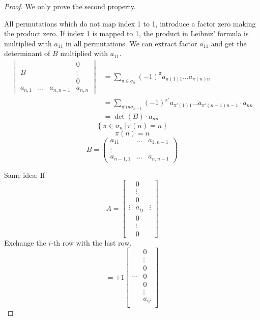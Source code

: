 \documentclass{article}
\numberwithin{lecref}{section}
\newcommand{\setdef}[2]{\left\{\left.#1\,\right|\,#2\right\}}
\begin{document}
\begin{proof}
  We only prove the second property.

  All permutations which do not map index 1 to 1, introduce a factor zero making the product zero.
  If index 1 is mapped to 1, the product in Leibniz' formula is multiplied with $a_{11}$ in all permutations.
  We can extract factor $a_{11}$ and get the determinant of $B$ multiplied with $a_{11}$.
  \begin{align*}
    \begin{vmatrix}
             &         &           & 0  \\
      B      &         &           & \vdots \\
             &         &           & 0  \\
      a_{n,1} & \ldots & a_{n,n-1} & a_{n,n}
    \end{vmatrix}
    &= \sum_{\pi \in \sigma_n} (-1)^{\pi} a_{\pi(1) 1} \dots a_{\pi(n) n} \\
    &= \sum_{\pi' in \sigma_{n-1}} (-1)^{\pi'} a_{\pi'(1) 1} \dots a_{\pi'(n-1) n-1} \cdot a_{nn} \\
    &= \det(B) \cdot a_{nn}
  \end{align*}
  \[ \setdef{\pi \in \sigma_n}{\pi(n) = n} \]
  \[ \pi(n) = n \]
  \[
    B = \begin{pmatrix}
      a_{11} & \ldots & a_{1,n-1} \\
      \vdots &        & \\
      a_{n-1,1} & \ldots & a_{n,n-1}
    \end{pmatrix}
  \]

  Same idea: If
  \[
    A = \begin{bmatrix}
      & 0 & \\
      & \vdots & \\
      & 0 & \\
      \vdots & a_{ij} & \vdots \\
      & 0 & \\
      & \vdots & \\
      & 0 &
    \end{bmatrix}
  \]
  Exchange the $i$-th row with the last row.
  \[
    = \pm 1 \begin{bmatrix}
      & 0 \\
      & \vdots \\
      & 0 \\
      \cdots & 0 \\
      & 0 \\
      & \vdots \\
      & a_{ij} \\
    \end{bmatrix}
  \]
\end{proof}
\end{document}
